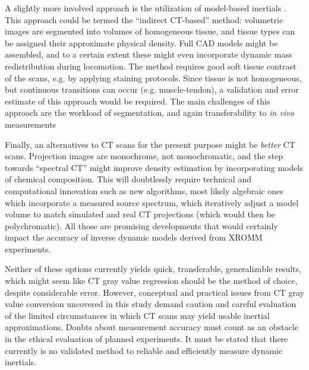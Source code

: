 A slightly more involved approach is the utilization of model-based inertials \citep{Hutchinson2007,Allen2009}.
This approach could be termed the ``indirect CT-based'' method: volumetric images are segmented into volumes of homogeneous tissue, and tissue types can be assigned their approximate physical density.
Full CAD models might be assembled, and to a certain extent these might even incorporate dynamic mass redistribution during locomotion.
The method requires good soft tissue contrast of the scans, e.g. by applying staining protocols.
Since tissue is not homogeneous, but continuous transitions can occur (e.g. muscle-tendon), a validation and error estimate of this approach would be required.
The main challenges of this approach are the workload of segmentation, and again transferability to \emph{in vivo} measurements


Finally, an alternatives to CT scans for the present purpose might be \emph{better} CT scans.
Projection images are monochrome, not monochromatic, and the step towards ``spectral CT'' might improve density estimation by incorporating models of chemical composition.
This will doubtlessly require technical and computational innovation such as new algorithms, most likely algebraic ones which incorporate a measured source spectrum, which iteratively adjust a model volume to match simulated and real CT projections (which would then be polychromatic).
All those are promising developments that would certainly impact the accuracy of inverse dynamic models derived from XROMM experiments.



Neither of these options currently yields quick, transferable, generalizable results, which might seem like CT gray value regression should be the method of choice, despite considerable error.
However, conceptual and practical issues from CT gray value conversion uncovered in this study demand caution and careful evaluation of the limited circumstances in which CT scans may yield usable inertial approximations.
Doubts about measurement accuracy must count as an obstacle in the ethical evaluation of planned experiments.
It must be stated that there currently is no validated method to reliable and efficiently measure dynamic inertials.


\clearpage
